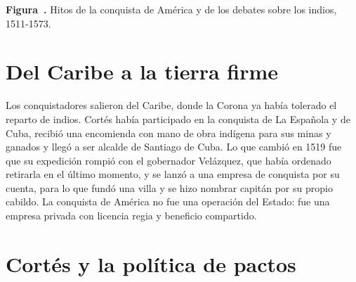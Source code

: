 \documentclass{book}
\newcounter{studiumfigure}
\begin{document}
\begin{minipage}{\linewidth}
%
\fi
\fi
\endgroup
\par\nopagebreak
{\small {}\label{fig:conquista-cronologia}\textbf{Figura~\thestudiumfigure.} Hitos de la conquista de América y de los debates sobre los indios, 1511-1573.\par}
\end{minipage}
\par\vspace{\baselineskip}

\section{Del Caribe a la tierra firme}

Los conquistadores salieron del Caribe, donde la Corona ya había tolerado el reparto de indios. Cortés había participado en la conquista de La Española y de Cuba, recibió una encomienda con mano de obra indígena para sus minas y ganados y llegó a ser alcalde de Santiago de Cuba. Lo que cambió en 1519 fue que su expedición rompió con el gobernador Velázquez, que había ordenado retirarla en el último momento, y se lanzó a una empresa de conquista por su cuenta, para lo que fundó una villa y se hizo nombrar capitán por su propio cabildo. La conquista de América no fue una operación del Estado: fue una empresa privada con licencia regia y beneficio compartido.


\section{Cortés y la política de pactos}
\end{document}
